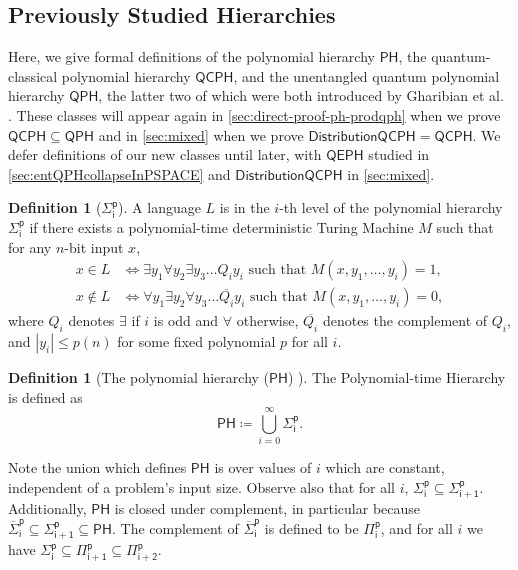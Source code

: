\documentclass[10pt,a4paper]{article}
\theoremstyle{definition}
\newtheorem{definition}[theorem]{Definition}
\newcommand{\class}[1]{\ensuremath{\mathsf{#1}}\xspace}
\newcommand{\PH}{\class{PH}}
\newcommand{\Sigmai}[1][i]{\class{\Sigma^{p}_{#1}}}
\newcommand{\Pii}[1][i]{\class{\Pi^{p}_{#1}}}
\newcommand{\QCPH}{\class{QCPH}}
\newcommand{\QPH}{\class{QPH}}
\newcommand{\QEPH}{\class{QEPH}}
\newcommand{\distributionQCPH}{\mathsf{DistributionQCPH}}
\newcommand{\abs}[1]{\left\lvert #1 \right\rvert}
\begin{document}
\subsection{Previously Studied Hierarchies}\label{subsec:prelim-qph}

Here, we give formal definitions of the polynomial hierarchy $\PH$, 
the quantum-classical polynomial hierarchy $\QCPH$,
and the unentangled quantum polynomial hierarchy $\QPH$, the latter two of which were both introduced by Gharibian et al. \cite{GSSSY22_qph}.
These classes will appear again in \cref{sec:direct-proof-ph-prodqph} when we prove $\QCPH\subseteq \QPH$ and in \cref{sec:mixed} when we prove $\distributionQCPH= \QCPH$.
We defer definitions of our new classes until later, with $\QEPH$ studied in \cref{sec:entQPHcollapseInPSPACE} and $\distributionQCPH$ in \cref{sec:mixed}.

\begin{definition}[$\Sigmai$]
    A language $L$ is in the $i$-th level of the polynomial hierarchy $\Sigmai$ if there exists a polynomial-time deterministic Turing Machine $M$ such that for any $n$-bit input $x$,
    \begin{align*}
        x\in L &\iff  \exists y_1 \forall y_2 \exists y_3 \dots Q_i y_i \text{ such that } M(x,y_1,\dots,y_i)=1 , \\
        x\not\in L &\iff \forall y_1 \exists y_2 \forall y_3 \dots \overline{Q_i} y_i \text{ such that } M(x,y_1,\dots,y_i)=0 ,
    \end{align*}
    where $Q_i$ denotes $\exists$ if $i$ is odd and $\forall$ otherwise, $\overline{Q_i}$ denotes the complement of $Q_i$, and $\abs{y_i} \leq p(n)$ for some fixed polynomial $p$ for all $i$.
\end{definition}

\begin{definition}[The polynomial hierarchy ($\PH$) \cite{stockmeyer1976polynomial}] The Polynomial-time Hierarchy is defined as 
    \[\PH \coloneqq \bigcup_{i=0}^{\infty} \Sigmai.\]
\end{definition}

Note the union which defines $\PH$ is over values of $i$ which are constant, independent of a problem's input size.
Observe also that for all $i$, $\Sigmai[i]\subseteq \Sigmai[i+1]$. Additionally, $\PH$ is closed under complement, in particular because $\class{\overline{\Sigma}_i^p} \subseteq \Sigmai[i+1] \subseteq \PH$. 
The complement of $\class{\overline{\Sigma}_i^p}$ is defined to be $\Pii[i]$, and for all $i$ we have $\Sigmai[i]\subseteq \Pii[i+1] \subseteq \Pii[i+2]$.
\end{document}
